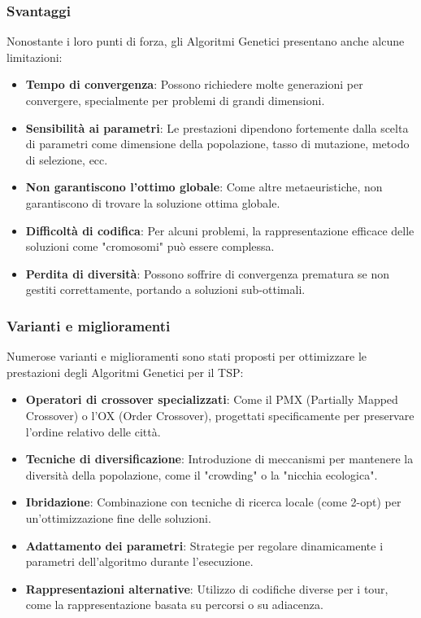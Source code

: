\subsubsection{Svantaggi}

Nonostante i loro punti di forza, gli Algoritmi Genetici presentano anche alcune limitazioni:

\begin{itemize}
	\item \textbf{Tempo di convergenza}: Possono richiedere molte generazioni per convergere, specialmente per problemi di grandi dimensioni.
	\item \textbf{Sensibilità ai parametri}: Le prestazioni dipendono fortemente dalla scelta di parametri come dimensione della popolazione, tasso di mutazione, metodo di selezione, ecc.
	\item \textbf{Non garantiscono l'ottimo globale}: Come altre metaeuristiche, non garantiscono di trovare la soluzione ottima globale.
	\item \textbf{Difficoltà di codifica}: Per alcuni problemi, la rappresentazione efficace delle soluzioni come "cromosomi" può essere complessa.
	\item \textbf{Perdita di diversità}: Possono soffrire di convergenza prematura se non gestiti correttamente, portando a soluzioni sub-ottimali.
\end{itemize}

\subsubsection{Varianti e miglioramenti}

Numerose varianti e miglioramenti sono stati proposti per ottimizzare le prestazioni degli Algoritmi Genetici per il \Gls{TSP}:

\begin{itemize}
	\item \textbf{Operatori di crossover specializzati}: Come il \Gls{PMX} (Partially Mapped Crossover) o l'\Gls{OX} (Order Crossover), progettati specificamente per preservare l'ordine relativo delle città.
	\item \textbf{Tecniche di diversificazione}: Introduzione di meccanismi per mantenere la diversità della popolazione, come il "crowding" o la "nicchia ecologica".
	\item \textbf{Ibridazione}: Combinazione con tecniche di ricerca locale (come 2-opt) per un'ottimizzazione fine delle soluzioni.
	\item \textbf{Adattamento dei parametri}: Strategie per regolare dinamicamente i parametri dell'algoritmo durante l'esecuzione.
	\item \textbf{Rappresentazioni alternative}: Utilizzo di codifiche diverse per i tour, come la rappresentazione basata su percorsi o su adiacenza.
\end{itemize}


